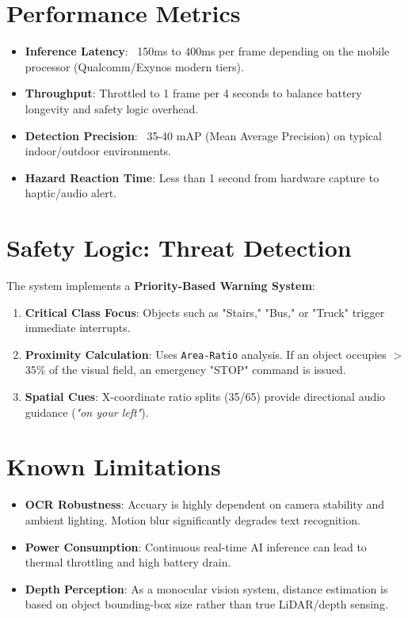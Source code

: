 \documentclass[12pt]{article}
\begin{document}
\section{Performance Metrics}
\begin{itemize}
    \item \textbf{Inference Latency}: ~150ms to 400ms per frame depending on the mobile processor (Qualcomm/Exynos modern tiers).
    \item \textbf{Throughput}: Throttled to 1 frame per 4 seconds to balance battery longevity and safety logic overhead.
    \item \textbf{Detection Precision}: ~35-40 mAP (Mean Average Precision) on typical indoor/outdoor environments.
    \item \textbf{Hazard Reaction Time}: Less than 1 second from hardware capture to haptic/audio alert.
\end{itemize}

\section{Safety Logic: Threat Detection}
The system implements a \textbf{Priority-Based Warning System}:
\begin{enumerate}
    \item \textbf{Critical Class Focus}: Objects such as "Stairs," "Bus," or "Truck" trigger immediate interrupts.
    \item \textbf{Proximity Calculation}: Uses \texttt{Area-Ratio} analysis. If an object occupies $>$35\% of the visual field, an emergency "STOP" command is issued.
    \item \textbf{Spatial Cues}: X-coordinate ratio splits (35/65) provide directional audio guidance (\textit{"on your left"}).
\end{enumerate}

\section{Known Limitations}
\begin{itemize}
    \item \textbf{OCR Robustness}: Accuary is highly dependent on camera stability and ambient lighting. Motion blur significantly degrades text recognition.
    \item \textbf{Power Consumption}: Continuous real-time AI inference can lead to thermal throttling and high battery drain.
    \item \textbf{Depth Perception}: As a monocular vision system, distance estimation is based on object bounding-box size rather than true LiDAR/depth sensing.
\end{itemize}
\end{document}
